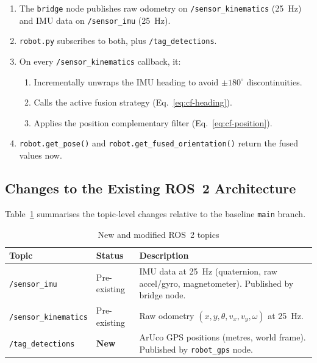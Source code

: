 \documentclass[12pt,letterpaper]{article}
\begin{document}
\begin{enumerate}
  \item The \texttt{bridge} node publishes raw odometry on
        \texttt{/sensor\_kinematics} (25~Hz) and IMU data on
        \texttt{/sensor\_imu} (25~Hz).
  \item \texttt{robot.py} subscribes to both, plus \texttt{/tag\_detections}.
  \item On every \texttt{/sensor\_kinematics} callback, it:
    \begin{enumerate}[label=\alph*.]
      \item Incrementally unwraps the IMU heading to avoid
            $\pm 180^\circ$ discontinuities.
      \item Calls the active fusion strategy (Eq.~\ref{eq:cf-heading}).
      \item Applies the position complementary filter (Eq.~\ref{eq:cf-position}).
    \end{enumerate}
  \item \texttt{robot.get\_pose()} and \texttt{robot.get\_fused\_orientation()}
        return the fused values now.
\end{enumerate}


\subsection{Changes to the Existing ROS~2 Architecture}

Table~\ref{tab:topics} summarises the topic-level changes relative to the
baseline \texttt{main} branch.

\begin{table}[H]
  \centering
  \caption{New and modified ROS~2 topics}
  \label{tab:topics}
  \begin{tabularx}{\textwidth}{llX}
    \toprule
    \textbf{Topic} & \textbf{Status} & \textbf{Description} \\
    \midrule
    \texttt{/sensor\_imu} & Pre-existing & IMU data at 25~Hz (quaternion,
        raw accel/gyro, magnetometer). Published by bridge node. \\
    \texttt{/sensor\_kinematics} & Pre-existing & Raw odometry $(x, y,
        \theta, v_x, v_y, \omega)$ at 25~Hz. \\
    \texttt{/tag\_detections} & \textbf{New} & ArUco GPS positions
        (metres, world frame). Published by \texttt{robot\_gps} node. \\
    \bottomrule
  \end{tabularx}
\end{table}
\end{document}
